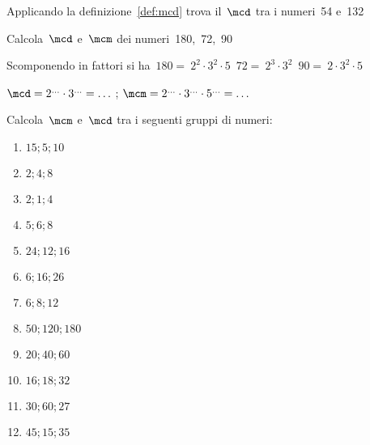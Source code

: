\subsubsection*{}

\begin{esercizio}
Applicando la definizione~\ref{def:mcd} trova il~\(\mcd\) tra i numeri~54 
e~132
\end{esercizio}


\begin{esercizio}
Calcola~\(\mcd\) e~\(\mcm\) dei numeri~180,~72,~90

Scomponendo in fattori si 
ha~\(180=~2^2\cdot3^2\cdot5\)~\(72 =~2^3\cdot3^2\)~\(90 =~2\cdot3^2\cdot5\)

\(\mcd =2^{\ldots}\cdot3^{\ldots}=\ldots\) \quad \quad \quad ; \quad 
\(\mcm =2^{\ldots}\cdot3^{\ldots}\cdot5^{\ldots}=\ldots \quad \quad \quad\)
\end{esercizio}


\begin{esercizio}[*]
Calcola~\(\mcm\) e~\(\mcd\) tra i seguenti gruppi di numeri:
\begin{multicols}{4}
 \begin{enumerate}[noitemsep, label=(\alph*)]
 \item \(15; 5; 10\)
 \item \(2; 4; 8\)
 \item \(2; 1; 4\)
 \item \(5; 6; 8\)
 \item \(24; 12; 16\)
 \item \(6; 16; 26\)
 \item \(6; 8; 12\)
 \item \(50; 120; 180\)
 \item \(20; 40; 60\)
 \item \(16; 18; 32\)
 \item \(30; 60; 27\)
 \item \(45; 15; 35\)
 \end{enumerate}
\end{multicols}
\end{esercizio}

